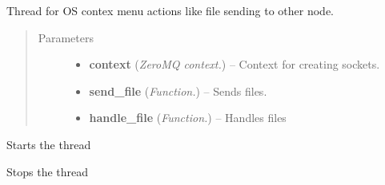 \documentclass[letterpaper,10pt,english]{sphinxmanual}
\begin{document}

\begin{fulllineitems}
\label{api:wos.SEND_FILE_CONTEX_MENU_HANDLER}
Thread for OS contex menu actions like file sending to other node.
\begin{quote}\begin{description}
\item[{Parameters}] \leavevmode\begin{itemize}
\item {} 
\textbf{context} (\emph{ZeroMQ context.}) -- Context for creating sockets.

\item {} 
\textbf{send\_file} (\emph{Function.}) -- Sends files.

\item {} 
\textbf{handle\_file} (\emph{Function.}) -- Handles files

\end{itemize}

\end{description}\end{quote}

\begin{fulllineitems}
\label{api:wos.SEND_FILE_CONTEX_MENU_HANDLER.run}
Starts the thread

\end{fulllineitems}


\begin{fulllineitems}
\label{api:wos.SEND_FILE_CONTEX_MENU_HANDLER.stop}
Stops the thread

\end{fulllineitems}


\end{fulllineitems}

\end{document}
